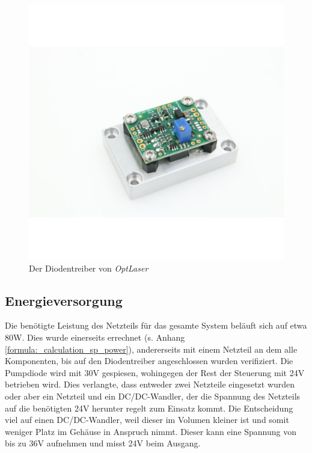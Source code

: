 \begin{figure}[H]
    \centering
    \includegraphics[scale=1, trim={25mm 20mm 15mm 30mm}, clip]{98_images/ldd-1500ma-35v-tp-laser-diode-driver.jpg}
    \caption{Der Diodentreiber von \textit{OptLaser}}
    \label{fig:diodentreiber_hw}
\end{figure}

\subsection{Energieversorgung}
Die benötigte Leistung des Netzteils für das gesamte System beläuft sich auf etwa 80W. Dies wurde einerseits errechnet (s. Anhang \ref{formula:_calculation_sp_power}), andererseits mit einem Netzteil an dem alle Komponenten, bis auf den Diodentreiber angeschlossen wurden verifiziert. Die Pumpdiode wird mit 30V gespiesen, wohingegen der Rest der Steuerung mit 24V betrieben wird. Dies verlangte, dass entweder zwei Netzteile eingesetzt wurden oder aber ein Netzteil und ein DC/DC-Wandler, der die Spannung des Netzteils auf die benötigten 24V herunter regelt zum Einsatz kommt. Die Entscheidung viel auf einen DC/DC-Wandler, weil dieser im Volumen kleiner ist und somit weniger Platz im Gehäuse in Anspruch nimmt. Dieser kann eine Spannung von bis zu 36V aufnehmen und misst 24V beim Ausgang.

